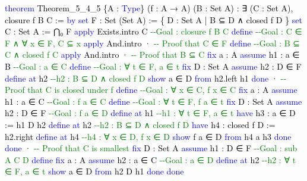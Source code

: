 \documentclass[
  letterpaper,
  DIV=11,
  numbers=noendperiod]{scrreprt}
\newenvironment{Shaded}{\begin{snugshade}}{\end{snugshade}}
\newcommand{\CommentTok}[1]{\textcolor[rgb]{0.37,0.37,0.37}{#1}}
\newcommand{\KeywordTok}[1]{\textcolor[rgb]{0.00,0.23,0.31}{#1}}
\newcommand{\NormalTok}[1]{\textcolor[rgb]{0.00,0.23,0.31}{#1}}
\renewcommand{\NormalTok}[1]{\textcolor[HTML]{000000}{#1}}
\renewcommand{\KeywordTok}[1]{\textcolor[HTML]{0000FF}{#1}}
\renewcommand{\CommentTok}[1]{\textcolor[HTML]{008000}{#1}}
\theoremstyle{remark}
\begin{document}
\begin{Shaded}
\begin{Highlighting}[]
\KeywordTok{theorem}\NormalTok{ Theorem\_5\_4\_5 \{A : }\KeywordTok{Type}\NormalTok{\} (f : A → A) (B : Set A) :}
\NormalTok{    ∃ (C : Set A), closure f B C := }\KeywordTok{by}
  \KeywordTok{set}\NormalTok{ F : Set (Set A) := \{ D : Set A | B ⊆ D ∧ closed f D \}}
  \KeywordTok{set}\NormalTok{ C : Set A := ⋂₀ F}
  \KeywordTok{apply}\NormalTok{ Exists.intro C    }\CommentTok{{-}{-}Goal : closure f B C}
  \KeywordTok{define}                  \CommentTok{{-}{-}Goal : C ∈ F ∧ ∀ x ∈ F, C ⊆ x}
  \KeywordTok{apply}\NormalTok{ And.intro}
\NormalTok{  · }\CommentTok{{-}{-} Proof that C ∈ F}
    \KeywordTok{define}                  \CommentTok{{-}{-}Goal : B ⊆ C ∧ closed f C}
    \KeywordTok{apply}\NormalTok{ And.intro}
\NormalTok{    · }\CommentTok{{-}{-} Proof that B ⊆ C}
      \KeywordTok{fix}\NormalTok{ a : A}
      \KeywordTok{assume}\NormalTok{ h1 : a ∈ B       }\CommentTok{{-}{-}Goal : a ∈ C}
      \KeywordTok{define}                  \CommentTok{{-}{-}Goal : ∀ t ∈ F, a ∈ t}
      \KeywordTok{fix}\NormalTok{ D : Set A}
      \KeywordTok{assume}\NormalTok{ h2 : D ∈ F}
      \KeywordTok{define} \KeywordTok{at}\NormalTok{ h2            }\CommentTok{{-}{-}h2 : B ⊆ D ∧ closed f D}
      \KeywordTok{show}\NormalTok{ a ∈ D }\KeywordTok{from}\NormalTok{ h2.left h1}
      \KeywordTok{done}
\NormalTok{    · }\CommentTok{{-}{-} Proof that C is closed under f}
      \KeywordTok{define}                  \CommentTok{{-}{-}Goal : ∀ x ∈ C, f x ∈ C}
      \KeywordTok{fix}\NormalTok{ a : A}
      \KeywordTok{assume}\NormalTok{ h1 : a ∈ C       }\CommentTok{{-}{-}Goal : f a ∈ C}
      \KeywordTok{define}                  \CommentTok{{-}{-}Goal : ∀ t ∈ F, f a ∈ t}
      \KeywordTok{fix}\NormalTok{ D : Set A}
      \KeywordTok{assume}\NormalTok{ h2 : D ∈ F       }\CommentTok{{-}{-}Goal : f a ∈ D}
      \KeywordTok{define} \KeywordTok{at}\NormalTok{ h1            }\CommentTok{{-}{-}h1 : ∀ t ∈ F, a ∈ t}
      \KeywordTok{have}\NormalTok{ h3 : a ∈ D := h1 D h2}
      \KeywordTok{define} \KeywordTok{at}\NormalTok{ h2            }\CommentTok{{-}{-}h2 : B ⊆ D ∧ closed f D}
      \KeywordTok{have}\NormalTok{ h4 : closed f D := h2.right}
      \KeywordTok{define} \KeywordTok{at}\NormalTok{ h4            }\CommentTok{{-}{-}h4 : ∀ x ∈ D, f x ∈ D}
      \KeywordTok{show}\NormalTok{ f a ∈ D }\KeywordTok{from}\NormalTok{ h4 a h3}
      \KeywordTok{done}
    \KeywordTok{done}
\NormalTok{  · }\CommentTok{{-}{-} Proof that C is smallest}
    \KeywordTok{fix}\NormalTok{ D : Set A}
    \KeywordTok{assume}\NormalTok{ h1 : D ∈ F      }\CommentTok{{-}{-}Goal : sub A C D}
    \KeywordTok{define}
    \KeywordTok{fix}\NormalTok{ a : A}
    \KeywordTok{assume}\NormalTok{ h2 : a ∈ C       }\CommentTok{{-}{-}Goal : a ∈ D}
    \KeywordTok{define} \KeywordTok{at}\NormalTok{ h2            }\CommentTok{{-}{-}h2 : ∀ t ∈ F, a ∈ t}
    \KeywordTok{show}\NormalTok{ a ∈ D }\KeywordTok{from}\NormalTok{ h2 D h1}
    \KeywordTok{done}
  \KeywordTok{done}
\end{Highlighting}
\end{Shaded}
\end{document}
